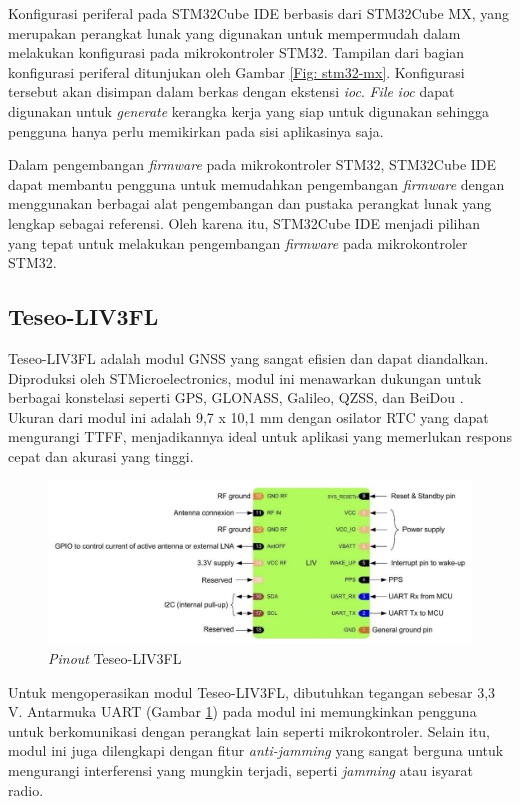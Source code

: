 Konfigurasi periferal pada STM32Cube IDE berbasis dari STM32Cube MX, yang merupakan perangkat lunak yang digunakan untuk mempermudah dalam melakukan konfigurasi pada mikrokontroler STM32. Tampilan dari bagian konfigurasi periferal ditunjukan oleh Gambar \ref{Fig: stm32-mx}. Konfigurasi tersebut akan disimpan dalam berkas dengan ekstensi \textit{ioc}. \textit{File} \textit{ioc} dapat digunakan untuk \textit{generate} kerangka kerja yang siap untuk digunakan sehingga pengguna hanya perlu memikirkan pada sisi aplikasinya saja.

Dalam pengembangan \textit{firmware} pada mikrokontroler STM32, STM32Cube IDE dapat membantu pengguna untuk memudahkan pengembangan \textit{firmware} dengan menggunakan berbagai alat pengembangan dan pustaka perangkat lunak yang lengkap sebagai referensi. Oleh karena itu, STM32Cube IDE menjadi pilihan yang tepat untuk melakukan pengembangan \textit{firmware} pada mikrokontroler STM32.

\subsection{Teseo\hyp{}LIV3FL}
Teseo\hyp{}LIV3FL adalah modul GNSS yang sangat efisien dan dapat diandalkan. Diproduksi oleh STMicroelectronics, modul ini menawarkan dukungan untuk berbagai konstelasi seperti GPS, GLONASS, Galileo, QZSS, dan BeiDou \cite{STMicroelectronics2022}. Ukuran dari modul ini adalah 9,7 x 10,1 mm dengan osilator RTC yang dapat mengurangi TTFF, menjadikannya ideal untuk aplikasi yang memerlukan respons cepat dan akurasi yang tinggi.

\begin{figure}[H]
	\centering
	\includegraphics[width=13cm]{contents/chapter-2/teseo_pinout.png}
	\caption{\textit{Pinout} Teseo\hyp{}LIV3FL \cite{STMicroelectronics2022}}
	\label{Fig: teseo_pinout}
\end{figure}

Untuk mengoperasikan modul Teseo\hyp{}LIV3FL, dibutuhkan tegangan sebesar 3,3 V. Antarmuka UART (Gambar \ref{Fig: teseo_pinout}) pada modul ini memungkinkan pengguna untuk berkomunikasi dengan perangkat lain seperti mikrokontroler. Selain itu, modul ini juga dilengkapi dengan fitur \textit{anti-jamming} yang sangat berguna untuk mengurangi interferensi yang mungkin terjadi, seperti \textit{jamming} atau isyarat radio.

